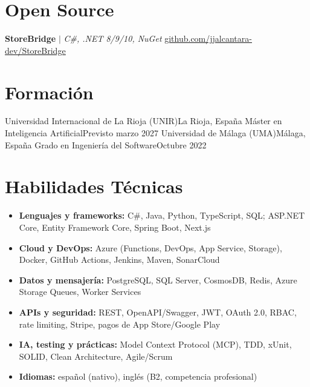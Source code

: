 \documentclass[a4paper,10pt]{article}
\begin{document}
  \resumeSubHeadingListEnd

\vspace{-4pt}

\section{Open Source}
  \resumeSubHeadingListStart
    \resumeProjectHeading
      {\textbf{StoreBridge} $|$ \emph{C\#, .NET 8/9/10, NuGet}}
      {\href{https://github.com/jjalcantara-dev/StoreBridge}{\underline{github.com/jjalcantara-dev/StoreBridge}}}
    \resumeItemListStart
    \resumeItemListEnd
  \resumeSubHeadingListEnd

\vspace{-4pt}

\section{Formación}
  \resumeSubHeadingListStart
    \resumeSubheading
      {Universidad Internacional de La Rioja (UNIR)}{La Rioja, España}
      {Máster en Inteligencia Artificial}{Previsto marzo 2027}
    \resumeSubheading
      {Universidad de Málaga (UMA)}{Málaga, España}
      {Grado en Ingeniería del Software}{Octubre 2022}
  \resumeSubHeadingListEnd

\vspace{-4pt}

\section{Habilidades Técnicas}
\vspace{2pt}
\small
\begin{itemize}[leftmargin=0pt, label={}, topsep=0pt, itemsep=1pt, parsep=0pt]
  \item \textbf{Lenguajes y frameworks:} C\#, Java, Python, TypeScript, SQL; ASP.NET Core, Entity Framework Core, Spring Boot, Next.js
  \item \textbf{Cloud y DevOps:} Azure (Functions, DevOps, App Service, Storage), Docker, GitHub Actions, Jenkins, Maven, SonarCloud
  \item \textbf{Datos y mensajería:} PostgreSQL, SQL Server, CosmosDB, Redis, Azure Storage Queues, Worker Services
  \item \textbf{APIs y seguridad:} REST, OpenAPI/Swagger, JWT, OAuth 2.0, RBAC, rate limiting, Stripe, pagos de App Store/Google Play
  \item \textbf{IA, testing y prácticas:} Model Context Protocol (MCP), TDD, xUnit, SOLID, Clean Architecture, Agile/Scrum
  \item \textbf{Idiomas:} español (nativo), inglés (B2, competencia profesional)
\end{itemize}
\end{document}
